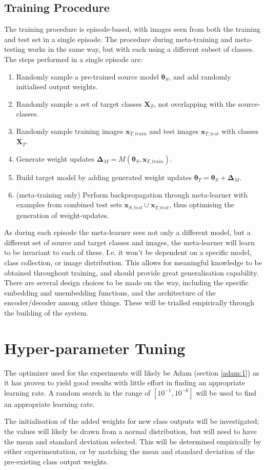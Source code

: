 \documentclass{report}
\begin{document}
	\subsection{Training Procedure}
	The training procedure is episode-based, with images seen from both the training and test set in a single episode. The procedure during meta-training and meta-testing works in the same way, but with each using a different subset of classes. The steps performed in a single episode are:
	\begin{enumerate}
		\item Randomly sample a pre-trained source model $\bm{\theta}_S$, and add randomly initialised output weights.
		\item Randomly sample a set of target classes $\bm{X}_T$, not overlapping with the source-classes.
		\item Randomly sample training images $\bm{x}_{T,train}$ and test images $\bm{x}_{T,test}$ with classes $\bm{X}_T$.
		\item Generate weight updates $\bm{\Delta}_M = M(\bm{\theta}_S, \bm{x}_{T,train})$.
		\item Build target model by adding generated weight updates $\bm{\theta}_T = \bm{\theta}_S + \bm{\Delta}_M$.
		\item (meta-training only) Perform backpropagation through meta-learner with examples from combined test sets $\bm{x}_{S,test} \cup \bm{x}_{T,test}$, thus optimising the generation of weight-updates.
	\end{enumerate}
	As during each episode the meta-learner sees not only a different model, but a different set of source and target classes and images, the meta-learner will learn to be invariant to each of these. I.e. it won't be dependent on a specific model, class collection, or image distribution. This allows for meaningful knowledge to be obtained throughout training, and should provide great generalisation capability. \newline \newline
	There are several design choices to be made on the way, including the specific embedding and unembedding functions, and the architecture of the encoder/decoder among other things. These will be trialled empirically through the building of the system.
	
	\section{Hyper-parameter Tuning}
	The optimizer used for the experiments will likely be Adam (section \ref{adam:1}) as it has proven to yield good results with little effort in finding an appropriate learning rate. A random search in the range of $[10^{-1}, 10^{-6}]$ will be used to find an appropriate learning rate. \par
	The initialisation of the added weights for new class outputs will be investigated; the values will likely be drawn from a normal distribution, but will need to have the mean and standard deviation selected. This will be determined empirically by either experimentation, or by matching the mean and standard deviation of the pre-existing class output weights. \par
	
\end{document}
